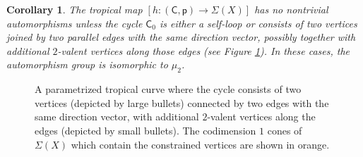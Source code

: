 \documentclass{article}
\newtheorem{corollary}[definition]{Corollary}
\newcommand{\tropC}{\mathsf{C}}
\begin{document}
\begin{corollary} \label{cor: automorphisms}
The tropical map $[h:(\mathsf{C},\mathsf{p}) \to \Sigma(X)]$ has no nontrivial automorphisms unless the cycle $\tropC_0$ is either a self-loop  or consists of two vertices joined by two parallel edges with the same direction vector, possibly together with additional $2$-valent vertices along those edges (see Figure \ref{fig: two vertices in cycle}). In these cases, the automorphism group is isomorphic to $\mu_2$. 
\end{corollary}


 \begin{figure}[h]
    \centering
    \caption{A parametrized tropical curve where the cycle consists of two vertices (depicted by large bullets) connected by two edges with the same direction vector, with additional $2$-valent vertices along the edges (depicted by small bullets). The codimension $1$ cones of $\Sigma(X)$ which contain the constrained vertices are shown in orange.}
    \label{fig: two vertices in cycle}
\end{figure}
\end{document}
